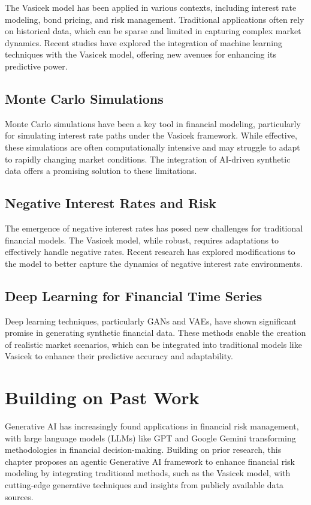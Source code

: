 \documentclass[a4paper,headinclude=on,footinclude=on,12pt,oneside]{scrbook}
\begin{document}
The Vasicek model has been applied in various contexts, including interest rate modeling, bond pricing, and risk management. Traditional applications often rely on historical data, which can be sparse and limited in capturing complex market dynamics. Recent studies have explored the integration of machine learning techniques with the Vasicek model, offering new avenues for enhancing its predictive power.

\subsection{Monte Carlo Simulations}

Monte Carlo simulations have been a key tool in financial modeling, particularly for simulating interest rate paths under the Vasicek framework. While effective, these simulations are often computationally intensive and may struggle to adapt to rapidly changing market conditions. The integration of AI-driven synthetic data offers a promising solution to these limitations.

\subsection{Negative Interest Rates and Risk}

The emergence of negative interest rates has posed new challenges for traditional financial models. The Vasicek model, while robust, requires adaptations to effectively handle negative rates. Recent research has explored modifications to the model to better capture the dynamics of negative interest rate environments.

\subsection{Deep Learning for Financial Time Series}

Deep learning techniques, particularly GANs and VAEs, have shown significant promise in generating synthetic financial data. These methods enable the creation of realistic market scenarios, which can be integrated into traditional models like Vasicek to enhance their predictive accuracy and adaptability.

\section{Building on Past Work}

Generative AI has increasingly found applications in financial risk management, with large language models (LLMs) like GPT and Google Gemini transforming methodologies in financial decision-making. Building on prior research, this chapter proposes an agentic Generative AI framework to enhance financial risk modeling by integrating traditional methods, such as the Vasicek model, with cutting-edge generative techniques and insights from publicly available data sources.
\end{document}

